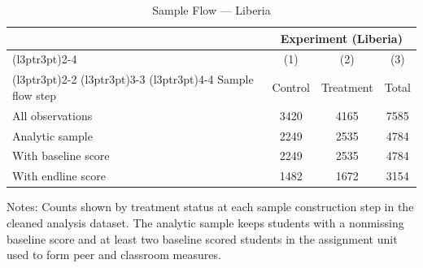 \begin{table}[H]
\centering
\caption{Sample Flow --- Liberia}
\label{tab:lib_sampleflow}
\begin{threeparttable}
\begin{tabular}[t]{lccc}
\toprule
\multicolumn{1}{c}{ } & \multicolumn{3}{c}{Experiment (Liberia)} \\
\cmidrule(l{3pt}r{3pt}){2-4}
\multicolumn{1}{c}{ } & \multicolumn{1}{c}{(1)} & \multicolumn{1}{c}{(2)} & \multicolumn{1}{c}{(3)} \\
\cmidrule(l{3pt}r{3pt}){2-2} \cmidrule(l{3pt}r{3pt}){3-3} \cmidrule(l{3pt}r{3pt}){4-4}
Sample flow step & Control & Treatment & Total \\
\midrule
All observations & 3420 & 4165 & 7585 \\
Analytic sample & 2249 & 2535 & 4784 \\
With baseline score & 2249 & 2535 & 4784 \\
With endline score & 1482 & 1672 & 3154 \\
\bottomrule
\end{tabular}
\begin{tablenotes}[para]
\item Notes: Counts shown by treatment status at each sample construction step in the cleaned analysis dataset. The analytic sample keeps students with a nonmissing baseline score and at least two baseline scored students in the assignment unit used to form peer and classroom measures.
\end{tablenotes}
\end{threeparttable}
\end{table}
